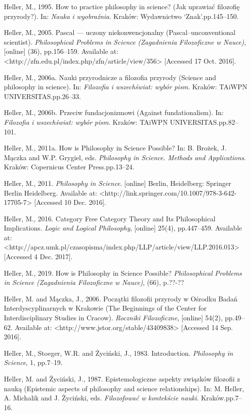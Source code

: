 \documentclass[a4paper]{article}
\begin{document}
Heller, M., 1995. How to practice philosophy in science? (Jak uprawiać filozofię przyrody?). In: \textit{Nauka i
wyobraźnia}. Kraków: Wydawnictwo ‘Znak’.pp.145–150.

Heller, M., 2005. Pascal — uczony niekonwencjonalny (Pascal–unconventional scientist). \textit{Philosophical Problems in
Science (Zagadnienia Filozoficzne w Nauce)}, [online] (36), pp.156–159. Available at:
{\textless}http://zfn.edu.pl/index.php/zfn/article/view/356{\textgreater} [Accessed 17 Oct. 2016].

Heller, M., 2006a. Nauki przyrodnicze a filozofia przyrody (Science and philosophy in science). In: \textit{Filozofia i
wszechświat: wybór pism}. Kraków: TAiWPN UNIVERSITAS.pp.26–33.

Heller, M., 2006b. Przeciw fundacjonizmowi (Against fundationalism). In: \textit{Filozofia i wszechświat: wybór pism}.
Kraków: TAiWPN UNIVERSITAS.pp.82–101.

Heller, M., 2011a. How is Philosophy in Science Possible? In: B. Brożek, J. Mączka and W.P. Grygiel, eds.
\textit{Philosophy in Science. Methods and Applications}. Kraków: Copernicus Center Press.pp.13–24.

Heller, M., 2011. \textit{Philosophy in Science}. [online] Berlin, Heidelberg: Springer Berlin Heidelberg. Available at:
{\textless}http://link.springer.com/10.1007/978-3-642-17705-7{\textgreater} [Accessed 10 Dec. 2016].

Heller, M., 2016. Category Free Category Theory and Its Philosophical Implications. \textit{Logic and Logical
Philosophy}, [online] 25(4), pp.447–459. Available at:
{\textless}http://apcz.umk.pl/czasopisma/index.php/LLP/article/view/LLP.2016.013{\textgreater} [Accessed 4 Dec. 2017].

Heller, M., 2019. How is Philosophy in Science Possible? \textit{Philosophical Problems in Science (Zagadnienia
Filozoficzne w Nauce)}, (66), p.??-??

Heller, M. and Mączka, J., 2006. Początki filozofii przyrody w Ośrodku Badań Interdyscyplinarnych w Krakowie (The
Beginnings of the Center for Interdisciplinary Studies in Cracow). \textit{Roczniki Filozoficzne}, [online] 54(2),
pp.49–62. Available at: {\textless}http://www.jstor.org/stable/43409838{\textgreater} [Accessed 14 Sep. 2016].

Heller, M., Stoeger, W.R. and Życiński, J., 1983. Introduction. \textit{Philosophy in Science}, 1, pp.7–19.

Heller, M. and Życiński, J., 1987. Epistemologiczne aspekty związków filozofii z nauką (Epistemic aspects of philosophy
and science relationships). In: M. Heller, A. Michalik and J. Życiński, eds. \textit{Filozofować w kontekście nauki}.
Kraków.pp.7–16.
\end{document}
